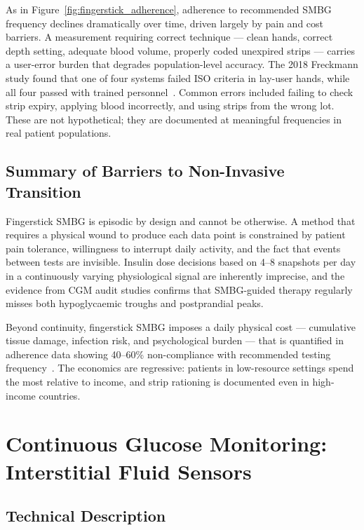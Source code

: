 As in Figure~\ref{fig:fingerstick_adherence}, adherence to recommended SMBG frequency declines dramatically over time, driven largely by pain and cost barriers. A measurement requiring correct technique --- clean hands, correct depth setting, adequate blood volume, properly coded unexpired strips --- carries a user-error burden that degrades population-level accuracy. The 2018 Freckmann study found that one of four systems failed ISO criteria in lay-user hands, while all four passed with trained personnel~\cite{freckmann2018user}. Common errors included failing to check strip expiry, applying blood incorrectly, and using strips from the wrong lot. These are not hypothetical; they are documented at meaningful frequencies in real patient populations.

\section{Summary of Barriers to Non-Invasive Transition}

Fingerstick SMBG is episodic by design and cannot be otherwise. A method that requires a physical wound to produce each data point is constrained by patient pain tolerance, willingness to interrupt daily activity, and the fact that events between tests are invisible. Insulin dose decisions based on 4--8 snapshots per day in a continuously varying physiological signal are inherently imprecise, and the evidence from CGM audit studies confirms that SMBG-guided therapy regularly misses both hypoglycaemic troughs and postprandial peaks.

Beyond continuity, fingerstick SMBG imposes a daily physical cost --- cumulative tissue damage, infection risk, and psychological burden --- that is quantified in adherence data showing 40--60\% non-compliance with recommended testing frequency~\cite{lancing_pmid}. The economics are regressive: patients in low-resource settings spend the most relative to income, and strip rationing is documented even in high-income countries.

\chapter{Continuous Glucose Monitoring: Interstitial Fluid Sensors}
\label{ch:cgm}

\section{Technical Description}

